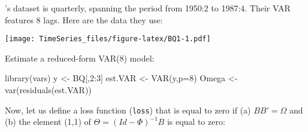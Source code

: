 \documentclass[
  12pt,
]{book}
\newenvironment{Shaded}{\begin{snugshade}}{\end{snugshade}}
\newcommand{\AttributeTok}[1]{\textcolor[rgb]{0.77,0.63,0.00}{#1}}
\newcommand{\DecValTok}[1]{\textcolor[rgb]{0.00,0.00,0.81}{#1}}
\newcommand{\FunctionTok}[1]{\textcolor[rgb]{0.00,0.00,0.00}{#1}}
\newcommand{\NormalTok}[1]{#1}
\newcommand{\OtherTok}[1]{\textcolor[rgb]{0.56,0.35,0.01}{#1}}
\newcommand{\SpecialCharTok}[1]{\textcolor[rgb]{0.00,0.00,0.00}{#1}}
\newcommand{\StringTok}[1]{\textcolor[rgb]{0.31,0.60,0.02}{#1}}
\theoremstyle{definition}
\theoremstyle{definition}
\theoremstyle{definition}
\theoremstyle{definition}
\theoremstyle{remark}
\begin{document}
\citet{Blanchard_Quah_1989}'s dataset is quarterly, spanning the period from 1950:2 to 1987:4. Their VAR features 8 lags. Here are the data they use:

\begin{Shaded}
\end{Shaded}

\texttt{[image: TimeSeries\_files/figure-latex/BQ1-1.pdf]}

Estimate a reduced-form VAR(8) model:

\begin{Shaded}
\begin{Highlighting}[]
\FunctionTok{library}\NormalTok{(vars)}
\NormalTok{y }\OtherTok{\textless{}{-}}\NormalTok{ BQ[,}\DecValTok{2}\SpecialCharTok{:}\DecValTok{3}\NormalTok{]}
\NormalTok{est.VAR }\OtherTok{\textless{}{-}} \FunctionTok{VAR}\NormalTok{(y,}\AttributeTok{p=}\DecValTok{8}\NormalTok{)}
\NormalTok{Omega }\OtherTok{\textless{}{-}} \FunctionTok{var}\NormalTok{(}\FunctionTok{residuals}\NormalTok{(est.VAR))}
\end{Highlighting}
\end{Shaded}

Now, let us define a loss function (\texttt{loss}) that is equal to zero if (a) \(BB'=\Omega\) and (b) the element (1,1) of \(\Theta = (Id - \Phi)^{-1} B\) is equal to zero:
\end{document}
